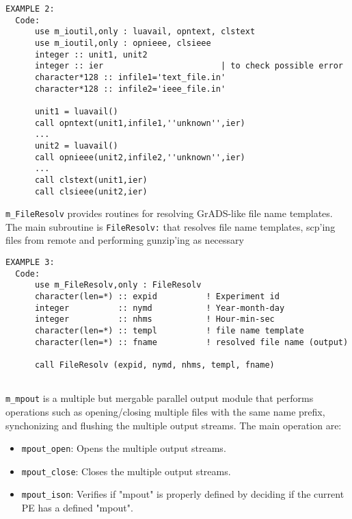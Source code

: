 %
\begin{verbatim}
EXAMPLE 2:
  Code:
      use m_ioutil,only : luavail, opntext, clstext
      use m_ioutil,only : opnieee, clsieee
      integer :: unit1, unit2
      integer :: ier                        | to check possible error
      character*128 :: infile1='text_file.in'
      character*128 :: infile2='ieee_file.in'

      unit1 = luavail()
      call opntext(unit1,infile1,''unknown'',ier)
      ...
      unit2 = luavail()
      call opnieee(unit2,infile2,''unknown'',ier)
      ...
      call clstext(unit1,ier)
      call clsieee(unit2,ier)
\end{verbatim}
%
{\tt m\_FileResolv} provides routines for resolving GrADS-like file name 
templates.
The main subroutine is {\tt FileResolv:} that resolves file name templates, 
scp'ing files from remote and performing gunzip'ing as necessary
%
\begin{verbatim}
EXAMPLE 3:
  Code:
      use m_FileResolv,only : FileResolv
      character(len=*) :: expid          ! Experiment id
      integer          :: nymd           ! Year-month-day
      integer          :: nhms           ! Hour-min-sec
      character(len=*) :: templ          ! file name template
      character(len=*) :: fname          ! resolved file name (output)

      call FileResolv (expid, nymd, nhms, templ, fname)
            
\end{verbatim}
%
{\tt m\_mpout} is a multiple but mergable parallel output module that
performs operations such as opening/closing multiple files with the same 
name prefix, synchonizing and flushing the multiple output streams. 
The main operation are:
\begin{itemize}
\item {\tt mpout\_open}: Opens the multiple output streams.
\item {\tt mpout\_close}: Closes the multiple output streams.
\item {\tt mpout\_ison}: Verifies if "mpout" is properly defined by
      deciding if the current PE has a defined "mpout".
\end{itemize}
%

